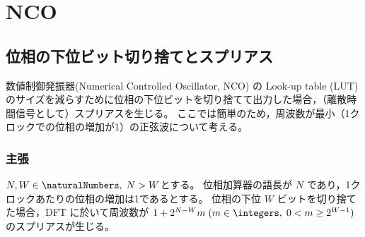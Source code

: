 \chapter{NCO}
    \section{位相の下位ビット切り捨てとスプリアス}
        数値制御発振器(Numerical Controlled Oscillator, NCO) の Look-up table (LUT) のサイズを減らすために位相の下位ビットを切り捨てて出力した場合，（離散時間信号として）スプリアスを生じる。
        ここでは簡単のため，周波数が最小（1クロックでの位相の増加が1）の正弦波について考える。
        \subsection{主張}
            \begin{shadebox}
                $N,W\in\naturalNumbers,\;N>W$とする。
                位相加算器の語長が $N$ であり，1クロックあたりの位相の増加は1であるとする。
                位相の下位 $W$ ビットを切り捨てた場合，DFT に於いて周波数が $1 + 2^{N-W}m\;(m\in\integers,\;0<m\geq 2^{W-1})$ のスプリアスが生じる。
            \end{shadebox}
